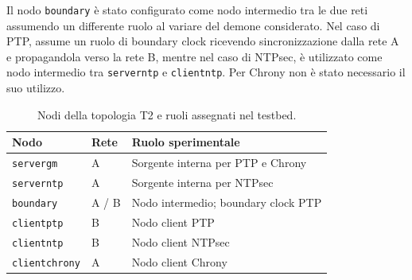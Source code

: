 Il nodo \texttt{boundary} è stato configurato come nodo intermedio tra le due reti
assumendo un differente ruolo al variare del demone considerato. Nel caso di PTP,
assume un ruolo di boundary clock ricevendo sincronizzazione dalla rete A e propagandola
verso la rete B, mentre nel caso di NTPsec, è utilizzato come nodo intermedio tra \texttt{serverntp}
e \texttt{clientntp}. Per Chrony non è stato necessario il suo utilizzo.

{ \setlength{\intextsep}{8pt} \setlength{\textfloatsep}{8pt} \setlength{\floatsep}{8pt}

\begin{table}[H]\captionsetup{skip=4pt} \begin{tabular}{lll}\hline \textbf{Nodo} & \textbf{Rete} & \textbf{Ruolo sperimentale} \\ \hline \texttt{servergm} & A & Sorgente interna per PTP e Chrony \\ \texttt{serverntp} & A & Sorgente interna per NTPsec \\ \texttt{boundary} & A / B & Nodo intermedio; boundary clock PTP \\ \texttt{clientptp} & B & Nodo client PTP \\ \texttt{clientntp} & B & Nodo client NTPsec \\ \texttt{clientchrony} & A & Nodo client Chrony \\ \hline\end{tabular} \caption{Nodi della topologia T2 e ruoli assegnati nel testbed.} \label{tab:nodi_t2}\end{table}

\vspace{1cm}

\begin{figure}[H]\centering {}
\end{figure}}
